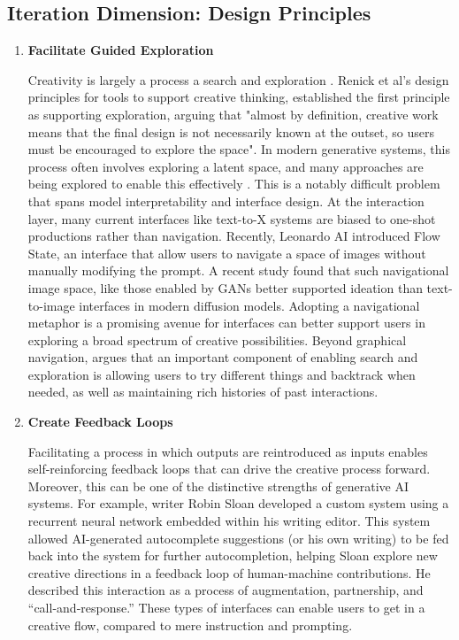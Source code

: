 \subsection{Iteration Dimension: Design Principles}

\begin{enumerate}

\item \textbf{Facilitate Guided Exploration}

Creativity is largely a process a search and exploration \cite{Ritchie2012-nb, Wiggins2006-zd, Boden1998-yn}.  Renick et al's \cite{Resnick2005-fs} design principles for tools to support creative thinking, established the first principle as supporting exploration, arguing that "almost by definition, creative work means that the final design is not necessarily known at the outset, so users must be encouraged to explore the space". In modern generative systems, this process often involves exploring a latent space, and many approaches are being explored to enable this effectively \cite{Loh2024-fb, Smith2022-dm, Schaerf2024-gf}. This is a notably difficult problem that spans model interpretability and interface design. At the interaction layer, many current interfaces like text-to-X systems are biased to one-shot productions rather than navigation. Recently, Leonardo AI introduced Flow State, an interface that allow users to navigate a space of images without manually modifying the prompt. A recent study \cite{Davis2024-ml} found that such navigational image space, like those enabled by GANs \cite{Goodfellow2014-jz} better supported ideation than text-to-image interfaces in modern diffusion models. Adopting a navigational metaphor is a promising avenue for interfaces can better support users in exploring a broad spectrum of creative possibilities. Beyond graphical navigation, \cite{Resnick2005-fs} argues that an important component of enabling search and exploration is allowing users to try different things and backtrack when needed, as well as maintaining rich histories of past interactions.   

\item \textbf{Create Feedback Loops}

Facilitating a process in which outputs are reintroduced as inputs enables self-reinforcing feedback loops that can drive the creative process forward. Moreover, this can be one of the distinctive strengths of generative AI systems. For example, writer Robin Sloan \cite{Sloan2016-fj} developed a custom system using a recurrent neural network embedded within his writing editor. This system allowed AI-generated autocomplete suggestions (or his own writing) to be fed back into the system for further autocompletion, helping Sloan explore new creative directions in a feedback loop of human-machine contributions. He described this interaction as a process of augmentation, partnership, and “call-and-response.” These types of interfaces can enable users to get in a creative flow, compared to mere instruction and prompting. 


\end{enumerate}
